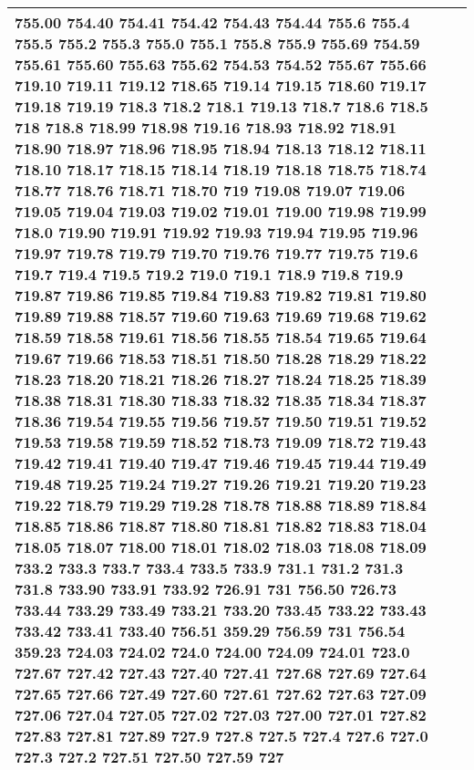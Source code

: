 \begin{longtable}{|R{.05in}|L{.65in}||L{5.65in}|}
755.00 754.40 754.41 754.42 754.43 754.44 755.6 755.4 755.5 755.2 755.3 755.0 755.1 755.8 755.9 755.69 754.59 755.61 755.60 755.63 755.62 754.53 754.52 755.67 755.66 719.10 719.11 719.12 718.65 719.14 719.15 718.60 719.17 719.18 719.19 718.3 718.2 718.1 719.13 718.7 718.6 718.5 718 718.8 718.99 718.98 719.16 718.93 718.92 718.91 718.90 718.97 718.96 718.95 718.94 718.13 718.12 718.11 718.10 718.17 718.15 718.14 718.19 718.18 718.75 718.74 718.77 718.76 718.71 718.70 719 719.08 719.07 719.06 719.05 719.04 719.03 719.02 719.01 719.00 719.98 719.99 718.0 719.90 719.91 719.92 719.93 719.94 719.95 719.96 719.97 719.78 719.79 719.70 719.76 719.77 719.75 719.6 719.7 719.4 719.5 719.2 719.0 719.1 718.9 719.8 719.9 719.87 719.86 719.85 719.84 719.83 719.82 719.81 719.80 719.89 719.88 718.57 719.60 719.63 719.69 719.68 719.62 718.59 718.58 719.61 718.56 718.55 718.54 719.65 719.64 719.67 719.66 718.53 718.51 718.50 718.28 718.29 718.22 718.23 718.20 718.21 718.26 718.27 718.24 718.25 718.39 718.38 718.31 718.30 718.33 718.32 718.35 718.34 718.37 718.36 719.54 719.55 719.56 719.57 719.50 719.51 719.52 719.53 719.58 719.59 718.52 718.73 719.09 718.72 719.43 719.42 719.41 719.40 719.47 719.46 719.45 719.44 719.49 719.48 719.25 719.24 719.27 719.26 719.21 719.20 719.23 719.22 718.79 719.29 719.28 718.78 718.88 718.89 718.84 718.85 718.86 718.87 718.80 718.81 718.82 718.83 718.04 718.05 718.07 718.00 718.01 718.02 718.03 718.08 718.09 733.2 733.3 733.7 733.4 733.5 733.9 731.1 731.2 731.3 731.8 733.90 733.91 733.92 726.91 731 756.50 726.73 733.44 733.29 733.49 733.21 733.20 733.45 733.22 733.43 733.42 733.41 733.40 756.51 359.29 756.59 731 756.54 359.23 724.03 724.02 724.0 724.00 724.09 724.01 723.0 727.67 727.42 727.43 727.40 727.41 727.68 727.69 727.64 727.65 727.66 727.49 727.60 727.61 727.62 727.63 727.09 727.06 727.04 727.05 727.02 727.03 727.00 727.01 727.82 727.83 727.81 727.89 727.9 727.8 727.5 727.4 727.6 727.0 727.3 727.2 727.51 727.50 727.59 727\\\hline

\end{longtable}
